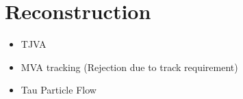 \chapter{Reconstruction}
\label{sec:reconstruction}

\begin{itemize}
\item TJVA
\item MVA tracking (Rejection due to track requirement)
\item Tau Particle Flow
\end{itemize}

\cite{atlas:taurec:run1}
\cite{atlas:taurec:run2}
\cite{atlas:taurec:decaymodes}
